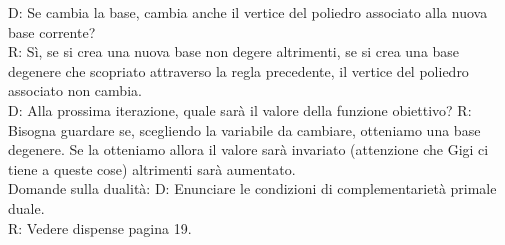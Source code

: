 \documentclass[10pt,                    %
               a4paper,                 %
               twoside,                 %
               openright,               %
               english,                 
               italian,                 
]{article}
\begin{document}
D: Se cambia la base, cambia anche il vertice del poliedro associato alla nuova base corrente? \\
R: Sì, se si crea una nuova base non degere altrimenti, se si crea una base degenere che scopriato attraverso la regla precedente, il vertice del poliedro associato non cambia. \\

D: Alla prossima iterazione, quale sarà il valore della funzione obiettivo?
R: Bisogna guardare se, scegliendo la variabile da cambiare, otteniamo una base degenere. Se la otteniamo allora il valore sarà invariato (attenzione che Gigi ci tiene a queste cose) altrimenti sarà aumentato. \\





Domande sulla dualità:
D: Enunciare le condizioni di complementarietà primale duale. \\
R: Vedere dispense pagina 19.  \\ 


 
\end{document}
